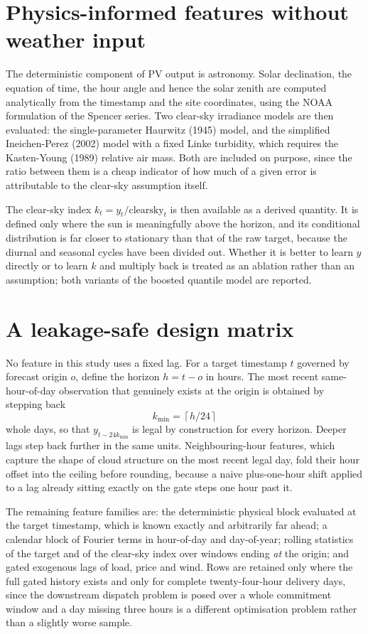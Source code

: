 \documentclass[11pt,a4paper,oneside]{report}
\begin{document}
\section{Physics-informed features without weather input}

The deterministic component of PV output is astronomy. Solar declination, the equation of time, the hour angle and hence the solar zenith are computed analytically from the timestamp and the site coordinates, using the NOAA formulation of the Spencer series. Two clear-sky irradiance models are then evaluated: the single-parameter Haurwitz (1945) model, and the simplified Ineichen-Perez (2002) model with a fixed Linke turbidity, which requires the Kasten-Young (1989) relative air mass. Both are included on purpose, since the ratio between them is a cheap indicator of how much of a given error is attributable to the clear-sky assumption itself.

The clear-sky index $k_t = y_t / \mathrm{clearsky}_t$ is then available as a derived quantity. It is defined only where the sun is meaningfully above the horizon, and its conditional distribution is far closer to stationary than that of the raw target, because the diurnal and seasonal cycles have been divided out. Whether it is better to learn $y$ directly or to learn $k$ and multiply back is treated as an ablation rather than an assumption; both variants of the boosted quantile model are reported.

\section{A leakage-safe design matrix}

No feature in this study uses a fixed lag. For a target timestamp $t$ governed by forecast origin $o$, define the horizon $h = t - o$ in hours. The most recent same-hour-of-day observation that genuinely exists at the origin is obtained by stepping back
\[
k_{\min} = \left\lceil h / 24 \right\rceil
\]
whole days, so that $y_{t - 24 k_{\min}}$ is legal by construction for every horizon. Deeper lags step back further in the same units. Neighbouring-hour features, which capture the shape of cloud structure on the most recent legal day, fold their hour offset into the ceiling before rounding, because a naive plus-one-hour shift applied to a lag already sitting exactly on the gate steps one hour past it.

The remaining feature families are: the deterministic physical block evaluated at the target timestamp, which is known exactly and arbitrarily far ahead; a calendar block of Fourier terms in hour-of-day and day-of-year; rolling statistics of the target and of the clear-sky index over windows ending \emph{at} the origin; and gated exogenous lags of load, price and wind. Rows are retained only where the full gated history exists and only for complete twenty-four-hour delivery days, since the downstream dispatch problem is posed over a whole commitment window and a day missing three hours is a different optimisation problem rather than a slightly worse sample.
\end{document}

